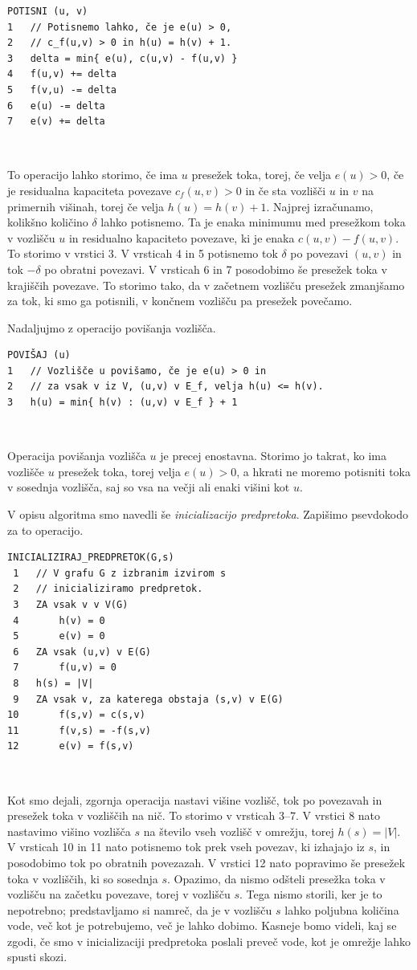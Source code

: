 \documentclass[mat1]{fmfdelo}
\begin{document}
\begin{verbatim}
POTISNI (u, v)
1   // Potisnemo lahko, če je e(u) > 0,
2   // c_f(u,v) > 0 in h(u) = h(v) + 1.
3   delta = min{ e(u), c(u,v) - f(u,v) }
4   f(u,v) += delta
5   f(v,u) -= delta
6   e(u) -= delta
7   e(v) += delta
\end{verbatim}~

To operacijo lahko storimo, če ima $u$ presežek toka, torej, če velja $e(u) > 0$, če je residualna kapaciteta povezave $c_f(u,v) > 0$ in če sta vozlišči $u$ in $v$ na primernih višinah, torej če velja $h(u) = h(v) + 1$. Najprej izračunamo, kolikšno količino $\delta$ lahko potisnemo. Ta je enaka minimumu med presežkom toka v vozlišču $u$ in residualno kapaciteto povezave, ki je enaka $c(u,v) - f(u,v)$. To storimo v vrstici 3. V vrsticah 4 in 5 potisnemo tok $\delta$ po povezavi $(u,v)$ in tok
$-\delta$ po obratni povezavi. V vrsticah 6 in 7 posodobimo še presežek toka v krajiščih povezave. To storimo tako, da v začetnem vozlišču presežek zmanjšamo za tok, ki smo ga potisnili, v končnem vozlišču pa presežek povečamo.

Nadaljujmo z operacijo povišanja vozlišča.\\

\begin{verbatim}
POVIŠAJ (u)
1   // Vozlišče u povišamo, če je e(u) > 0 in
2   // za vsak v iz V, (u,v) v E_f, velja h(u) <= h(v).
3   h(u) = min{ h(v) : (u,v) v E_f } + 1
\end{verbatim}~

Operacija povišanja vozlišča $u$ je precej enostavna. Storimo jo takrat, ko ima vozlišče $u$ presežek toka, torej velja $e(u) > 0$, a hkrati ne moremo potisniti toka v sosednja vozlišča, saj so vsa na večji ali enaki višini kot $u$.

V opisu algoritma smo navedli še \textit{inicializacijo predpretoka}. Zapišimo psevdokodo za to operacijo.\\

\begin{verbatim}
INICIALIZIRAJ_PREDPRETOK(G,s)
 1   // V grafu G z izbranim izvirom s
 2   // inicializiramo predpretok.
 3   ZA vsak v v V(G)
 4       h(v) = 0
 5       e(v) = 0
 6   ZA vsak (u,v) v E(G)
 7       f(u,v) = 0
 8   h(s) = |V|
 9   ZA vsak v, za katerega obstaja (s,v) v E(G)
10       f(s,v) = c(s,v)
11       f(v,s) = -f(s,v)
12       e(v) = f(s,v)
\end{verbatim}~

Kot smo dejali, zgornja operacija nastavi višine vozlišč, tok po povezavah in presežek toka v vozliščih na nič. To storimo v vrsticah 3--7. V vrstici 8 nato nastavimo višino vozlišča $s$ na število vseh vozlišč v omrežju, torej $h(s) = |V|$. V vrsticah 10 in 11 nato potisnemo tok prek vseh povezav, ki izhajajo iz $s$, in posodobimo tok po obratnih povezazah. V vrstici 12 nato popravimo še presežek toka v vozliščih, ki so sosednja $s$. Opazimo, da nismo odšteli presežka toka v vozlišču na začetku povezave, torej v vozlišču $s$. Tega nismo storili, ker je to nepotrebno; predstavljamo si namreč, da je v vozlišču $s$ lahko poljubna količina vode, več kot je potrebujemo, več je lahko dobimo. Kasneje bomo videli, kaj se zgodi, če smo v inicializaciji predpretoka poslali preveč vode, kot je omrežje lahko spusti skozi.
\end{document}
